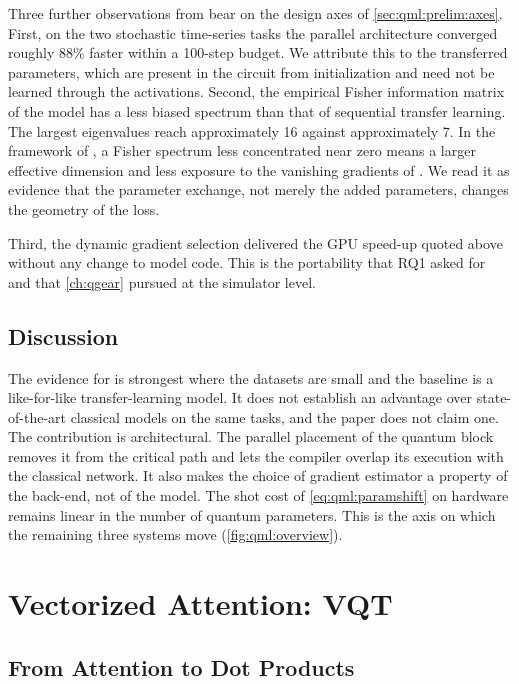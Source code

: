Three further observations from \cite{guo2025qpie} bear on the design axes of \cref{sec:qml:prelim:axes}. First, on the two stochastic time-series tasks the parallel architecture converged roughly 88\% faster within a 100-step budget. We attribute this to the transferred parameters, which are present in the circuit from initialization and need not be learned through the activations. Second, the empirical Fisher information matrix of the \qpie{} model has a less biased spectrum than that of sequential transfer learning. The largest eigenvalues reach approximately 16 against approximately 7. In the framework of \cite{abbas2021powerqnn}, a Fisher spectrum less concentrated near zero means a larger effective dimension and less exposure to the vanishing gradients of \cite{mcclean2018barren}. We read it as evidence that the parameter exchange, not merely the added parameters, changes the geometry of the loss.

Third, the dynamic gradient selection delivered the GPU speed-up quoted above without any change to model code. This is the portability that RQ1 asked for and that \cref{ch:qgear} pursued at the simulator level.

\subsection{Discussion}\label{sec:qml:qpie:discussion}

The evidence for \qpie{} is strongest where the datasets are small and the baseline is a like-for-like transfer-learning model. It does not establish an advantage over state-of-the-art classical models on the same tasks, and the paper does not claim one. The contribution is architectural. The parallel placement of the quantum block removes it from the critical path and lets the compiler overlap its execution with the classical network. It also makes the choice of gradient estimator a property of the back-end, not of the model. The shot cost of \cref{eq:qml:paramshift} on hardware remains linear in the number of quantum parameters. This is the axis on which the remaining three systems move (\cref{fig:qml:overview}).

\section{Vectorized Attention: VQT}\label{sec:qml:vqt}

\subsection{From Attention to Dot Products}\label{sec:qml:vqt:attention}

